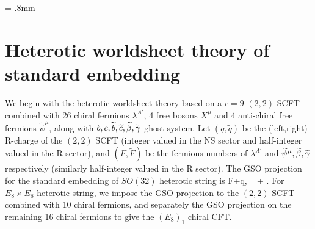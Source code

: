 \documentclass[12pt]{article}
\newcommand{\wt}[1]{\widetilde{#1}}
\begin{document}
\unitlength = .8mm


\section{Heterotic worldsheet theory of standard embedding}

We begin with the heterotic worldsheet theory based on a $c=9$ $(2,2)$ SCFT combined with 26 chiral fermions $\lambda^{A'}$, 4 free bosons $X^\mu$ and 4 anti-chiral free fermions $\wt\psi^\mu$, along with $b,c,\wt b,\wt c, \wt \B,\wt \C$ ghost system. Let $(q, \wt q)$ be the (left,right) R-charge of the $(2,2)$ SCFT (integer valued in the NS sector and half-integer valued in the R sector), and $(F, \wt F)$ be the fermions numbers of $\lambda^{A'}$ and $\wt\psi^\mu,\wt\B,\wt\C$ respectively (similarly half-integer valued in the R sector). The GSO projection for the standard embedding of $SO(32)$ heterotic string is
\ie
F+q, ~\wt F + \wt q .
\fe
For $E_8\times E_8$ heterotic string, we impose the GSO projection to the $(2,2)$ SCFT combined with 10 chiral fermions, and separately the GSO projection on the remaining 16 chiral fermions to give the $(E_8)_1$ chiral CFT.
\end{document}
